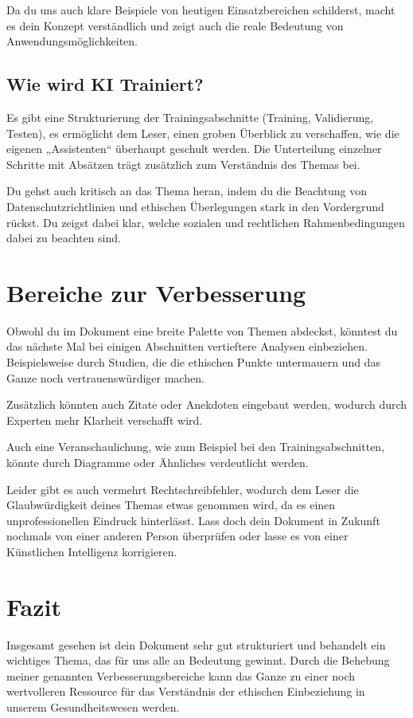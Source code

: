 \documentclass{article}
\begin{document}
\vspace{2mm}Da du uns auch klare Beispiele von heutigen Einsatzbereichen schilderst, macht es dein Konzept verständlich und zeigt auch die reale Bedeutung von Anwendungsmöglichkeiten.


\vspace{8mm}\subsection{Wie wird KI Trainiert?} 
 Es gibt eine Strukturierung der Trainingsabschnitte (Training, Validierung, Testen), es ermöglicht dem Leser, einen groben Überblick zu verschaffen, wie die eigenen „Assistenten“ überhaupt geschult werden. Die Unterteilung einzelner Schritte mit Absätzen trägt zusätzlich zum Verständnis des Themas bei.

 \vspace{2mm}Du gehst auch kritisch an das Thema heran, indem du die Beachtung von Datenschutzrichtlinien und ethischen Überlegungen stark in den Vordergrund rückst. Du zeigst dabei klar, welche sozialen und rechtlichen Rahmenbedingungen dabei zu beachten sind.

\section {Bereiche zur Verbesserung}
Obwohl du im Dokument eine breite Palette von Themen abdeckst, könntest du das nächste Mal bei einigen Abschnitten vertieftere Analysen einbeziehen. Beispielsweise durch Studien, die die ethischen Punkte untermauern und das Ganze noch vertrauenswürdiger machen.

\vspace{2mm}Zusätzlich könnten auch Zitate oder Anekdoten eingebaut werden, wodurch durch Experten mehr Klarheit verschafft wird.

\vspace{2mm}Auch eine Veranschaulichung, wie zum Beispiel bei den Trainingsabschnitten, könnte durch Diagramme oder Ähnliches verdeutlicht werden.

\vspace{2mm}Leider gibt es auch vermehrt Rechtschreibfehler, wodurch dem Leser die Glaubwürdigkeit deines Themas etwas genommen wird, da es einen unprofessionellen Eindruck hinterlässt. Lass doch dein Dokument in Zukunft nochmals von einer anderen Person überprüfen oder lasse es von einer Künstlichen Intelligenz korrigieren.



\vspace{10mm}\section{Fazit} 

Insgesamt gesehen ist dein Dokument sehr gut strukturiert und behandelt ein wichtiges Thema, das für uns alle an Bedeutung gewinnt. Durch die Behebung meiner genannten Verbesserungsbereiche kann das Ganze zu einer noch wertvolleren Ressource für das Verständnis der ethischen Einbeziehung in unserem Gesundheitswesen werden.
\end{document}
